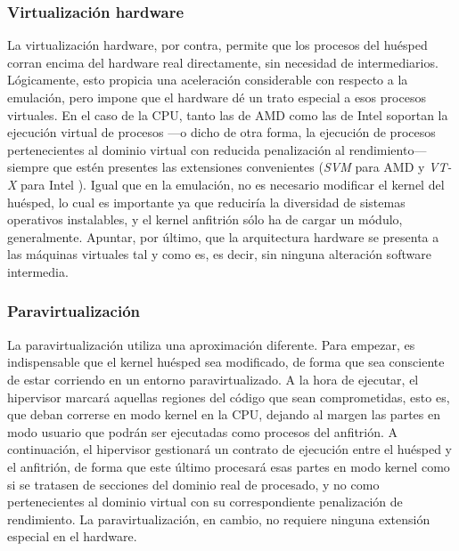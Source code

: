 \subsubsection{Virtualizaci\'on hardware}\label{subsubsec:virthardware}

\noindent La virtualizaci\'on hardware, por contra, permite que los procesos del hu\'esped corran encima del hardware real directamente, sin necesidad de in\-ter\-me\-dia\-rios. L\'ogicamente, esto propicia una aceleraci\'on considerable con respecto a la emulaci\'on, pero impone que el hardware d\'e un trato especial a esos procesos virtuales. En el caso de la CPU, tanto las de AMD como las de Intel soportan la ejecuci\'on virtual de procesos ---o dicho de otra forma, la ejecuci\'on de procesos pertenecientes al dominio virtual con reducida penalizaci\'on al rendimiento--- siempre que est\'en presentes las extensiones convenientes (\emph{SVM} para AMD y \emph{VT-X} para Intel \cite{intelvtx}). Igual que en la emulaci\'on, no es necesario modificar el kernel del hu\'esped, lo cual es importante ya que reducir\'ia la diversidad de sistemas operativos instalables, y el kernel anfitri\'on s\'olo ha de cargar un m\'odulo, ge\-ne\-ral\-men\-te. Apuntar, por \'ultimo, que la arquitectura hardware se presenta a las m\'aquinas virtuales tal y como es, es decir, sin ninguna alteraci\'on software intermedia.\newline

\subsubsection{Paravirtualizaci\'on}\label{subsubsec:paravirt}

\noindent La paravirtualizaci\'on utiliza una aproximaci\'on diferente. Para empezar, es indispensable que el kernel hu\'esped sea modificado, de forma que sea consciente de estar corriendo en un entorno paravirtualizado. A la hora de ejecutar, el hipervisor marcar\'a aquellas regiones del c\'odigo que sean comprometidas, esto es, que deban correrse en modo kernel en la CPU, dejando al margen las partes en modo usuario que podr\'an ser ejecutadas como procesos del anfitri\'on. A continuaci\'on, el hipervisor gestionar\'a un contrato de ejecuci\'on entre el hu\'esped y el anfitri\'on, de forma que este \'ultimo procesar\'a esas partes en modo kernel como si se tratasen de secciones del dominio real de procesado, y no como pertenecientes al dominio virtual con su correspondiente penalizaci\'on de rendimiento. La paravirtualizaci\'on, en cambio, no requiere ninguna extensi\'on especial en el hardware.\newline


